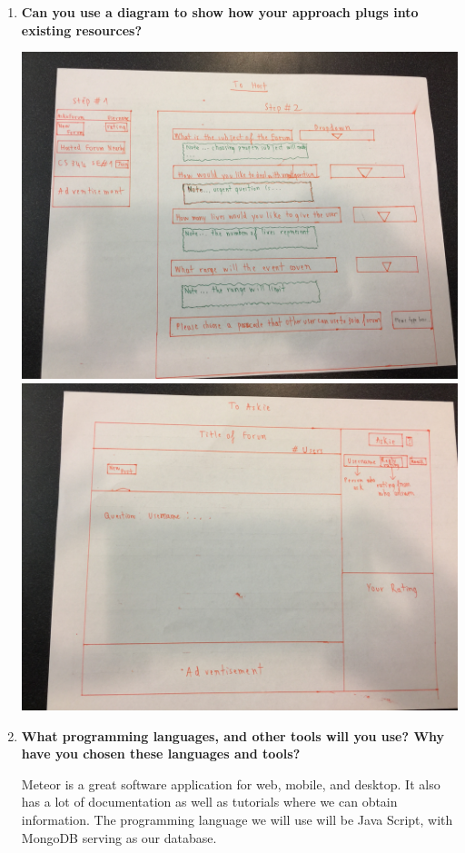 \documentclass[12pt]{article}
\begin{document}
\begin{enumerate}
    \item \textbf{Can you use a diagram to show how your approach plugs into existing resources?}
    
    \includegraphics[width=\textwidth]{Assignment_2_ProjectDescription1}
    \includegraphics[width=\textwidth]{Assignment_2_ProjectDescription2}

    \item \textbf{What programming languages, and other tools will you use? Why have you chosen these languages and tools?}

    Meteor is a great software application for web, mobile, and desktop. It also has a lot of documentation as well as tutorials where we can obtain information. The programming language we will use will be Java Script, with MongoDB serving as our database. 


\end{enumerate}
\end{document}
